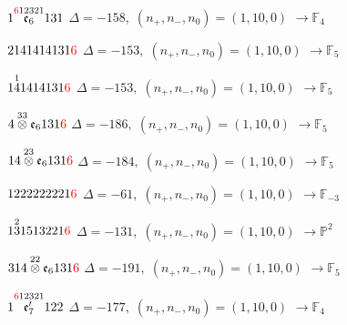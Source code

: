 \documentclass[10pt]{article}
\begin{document}
\smallskip

$1\overset{\textcolor{red}{6}12321}{\mathfrak{e}_6}131$ \quad $\Delta=-158,\; (n_+,n_-,n_0)=(1,10,0)$ \quad $\to \mathbb{F}_{4}$

\smallskip

$2141414131\textcolor{red}{6}$ \quad $\Delta=-153,\; (n_+,n_-,n_0)=(1,10,0)$ \quad $\to \mathbb{F}_{5}$

\smallskip

$1\overset{1}{4}1414131\textcolor{red}{6}$ \quad $\Delta=-153,\; (n_+,n_-,n_0)=(1,10,0)$ \quad $\to \mathbb{F}_{5}$

\smallskip

$4\overset{33}{\otimes}\mathfrak{e}_6131\textcolor{red}{6}$ \quad $\Delta=-186,\; (n_+,n_-,n_0)=(1,10,0)$ \quad $\to \mathbb{F}_{5}$

\smallskip

$14\overset{23}{\otimes}\mathfrak{e}_6131\textcolor{red}{6}$ \quad $\Delta=-184,\; (n_+,n_-,n_0)=(1,10,0)$ \quad $\to \mathbb{F}_{5}$

\smallskip

$1222222221\textcolor{red}{6}$ \quad $\Delta=-61,\; (n_+,n_-,n_0)=(1,10,0)$ \quad $\to \mathbb{F}_{-3}$

\smallskip

$1\overset{2}{3}1513221\textcolor{red}{6}$ \quad $\Delta=-131,\; (n_+,n_-,n_0)=(1,10,0)$ \quad $\to \mathbb{P}^2$

\smallskip

$314\overset{22}{\otimes}\mathfrak{e}_6131\textcolor{red}{6}$ \quad $\Delta=-191,\; (n_+,n_-,n_0)=(1,10,0)$ \quad $\to \mathbb{F}_{5}$

\smallskip

$1\overset{\textcolor{red}{6}12321}{\mathfrak{e}_7'}122$ \quad $\Delta=-177,\; (n_+,n_-,n_0)=(1,10,0)$ \quad $\to \mathbb{F}_{4}$

\smallskip
\end{document}
